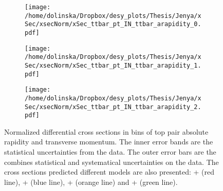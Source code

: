 
\begin{figure}[p]
\centering
\begin{subfigure}
  \centering
  \texttt{[image: /home/dolinska/Dropbox/desy\_plots/Thesis/Jenya/xSec/xsecNorm/xSec\_ttbar\_pt\_IN\_ttbar\_arapidity\_0.pdf]}
\end{subfigure}
\begin{subfigure}
  \centering
  \texttt{[image: /home/dolinska/Dropbox/desy\_plots/Thesis/Jenya/xSec/xsecNorm/xSec\_ttbar\_pt\_IN\_ttbar\_arapidity\_1.pdf]}
\end{subfigure}
\begin{subfigure}
  \centering
  \texttt{[image: /home/dolinska/Dropbox/desy\_plots/Thesis/Jenya/xSec/xsecNorm/xSec\_ttbar\_pt\_IN\_ttbar\_arapidity\_2.pdf]}
\end{subfigure}
\caption{Normalized differential cross sections in bins of top pair absolute rapidity and transverse momentum. The inner error bands are the statistical uncertainties from the data.
         The outer error bars are the combines statistical and systematical uncertainties on the data. The cross sections predicted different models are also presented:
         \MG + \PYTHIA (red line), \Powheg + \PYTHIA (blue line), \Powheg + \HERWIG (orange line) and \MCNLO + \HERWIG (green line).}
\label{fig:XS_2D_pttt_ytt}
\end{figure}
